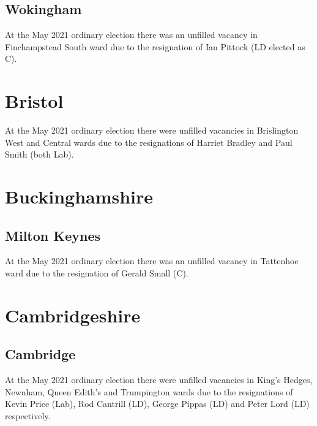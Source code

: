 \documentclass[a4paper,openany]{book}
\begin{document}
\begin{resultsiii}
\subsection*{Wokingham}

At the May 2021 ordinary election there was an unfilled vacancy in Finchampstead South ward due to the resignation of Ian Pittock (LD elected as C).

\section{Bristol}

At the May 2021 ordinary election there were unfilled vacancies in Brislington West and Central wards due to the resignations of Harriet Bradley and Paul Smith (both Lab).

\section{Buckinghamshire}

\subsection*{Milton Keynes}

At the May 2021 ordinary election there was an unfilled vacancy in Tattenhoe ward due to the resignation of Gerald Small (C).

\section{Cambridgeshire}

\subsection*{Cambridge}

At the May 2021 ordinary election there were unfilled vacancies in King's Hedges, Newnham, Queen Edith's and Trumpington wards due to the resignations of Kevin Price (Lab), Rod Cantrill (LD), George Pippas (LD) and Peter Lord (LD) respectively.


\end{resultsiii}
\end{document}
